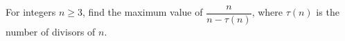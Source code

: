 For integers $n\ge3$, find the maximum value of $\dfrac n{n-\tau(n)}$, where $\tau(n)$ is the number of divisors of $n$.
